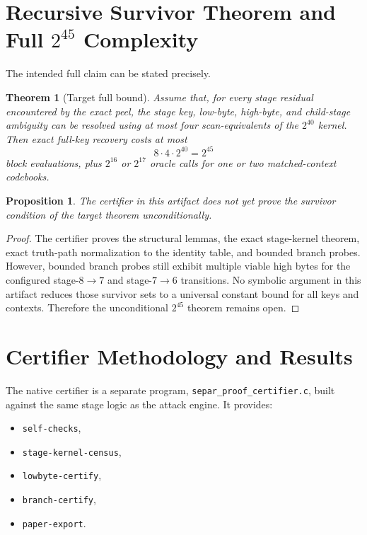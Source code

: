 \documentclass[11pt]{article}
\newtheorem{theorem}{Theorem}
\newtheorem{proposition}{Proposition}
\providecommand{\StageKernelBound}{2^{40}}
\providecommand{\FullTargetBound}{2^{45}}
\begin{document}
\section{Recursive Survivor Theorem and Full $2^{45}$ Complexity}
The intended full claim can be stated precisely.

\begin{theorem}[Target full bound]
Assume that, for every stage residual encountered by the exact peel, the stage key, low-byte, high-byte, and child-stage ambiguity can be resolved using at most four scan-equivalents of the \(\StageKernelBound\) kernel. Then exact full-key recovery costs at most
\[
8\cdot 4\cdot 2^{40}=2^{45}
\]
block evaluations, plus \(2^{16}\) or \(2^{17}\) oracle calls for one or two matched-context codebooks.
\end{theorem}

\begin{proposition}
The certifier in this artifact does not yet prove the survivor condition of the target theorem unconditionally.
\end{proposition}

\begin{proof}
The certifier proves the structural lemmas, the exact stage-kernel theorem, exact truth-path normalization to the identity table, and bounded branch probes. However, bounded branch probes still exhibit multiple viable high bytes for the configured stage-\(8\to7\) and stage-\(7\to6\) transitions. No symbolic argument in this artifact reduces those survivor sets to a universal constant bound for all keys and contexts. Therefore the unconditional \(\FullTargetBound\) theorem remains open.
\end{proof}

\section{Certifier Methodology and Results}
The native certifier is a separate program, \texttt{separ\_proof\_certifier.c}, built against the same stage logic as the attack engine. It provides:
\begin{itemize}
\item \texttt{self-checks},
\item \texttt{stage-kernel-census},
\item \texttt{lowbyte-certify},
\item \texttt{branch-certify},
\item \texttt{paper-export}.
\end{itemize}
\end{document}
